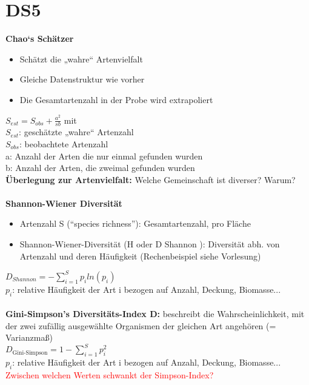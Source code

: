 \section{DS5}
\textbf{Chao‘s Schätzer}
\begin{itemize}
	\item Schätzt die „wahre“ Artenvielfalt
	\item Gleiche Datenstruktur wie vorher
	\item Die Gesamtartenzahl in der Probe wird extrapoliert
\end{itemize}

$\displaystyle S_{est}=S_{obs} + \frac{a^2}{sb}$ mit\\
$S_{est}$: geschätzte „wahre“ Artenzahl\\
$S_{obs}$: beobachtete Artenzahl\\
a: Anzahl der Arten die nur einmal gefunden wurden\\
b: Anzahl der Arten, die zweimal gefunden wurden\\

\textbf{Überlegung zur Artenvielfalt:} Welche Gemeinschaft ist diverser? Warum?
\\\\
\textbf{Shannon-Wiener Diversität}
\begin{itemize}
	\item Artenzahl S (“species richness”): Gesamtartenzahl, pro Fläche
	\item Shannon-Wiener-Diversität (H oder D Shannon ): Diversität abh. von Artenzahl und deren Häufigkeit (Rechenbeispiel siehe Vorlesung)
\end{itemize}

$D_{Shannon}=\displaystyle -\sum_{i=1}^{S} p_i ln(p_i)$\\
$p_i$: relative Häufigkeit der Art i bezogen auf Anzahl, Deckung, Biomasse...
\\\\
\textbf{Gini-Simpson's Diversitäts-Index D:} beschreibt die Wahrscheinlichkeit, mit der zwei zufällig ausgewählte Organismen der gleichen Art angehören (= Varianzmaß)\\

$D_{\text{Gini-Simpson}}=\displaystyle 1-\sum_{i=1}^{S} p_i^2$\\
$p_i$: relative Häufigkeit der Art i bezogen auf Anzahl, Deckung, Biomasse...
\\
\textcolor{red}{Zwischen welchen Werten schwankt der Simpson-Index?}

